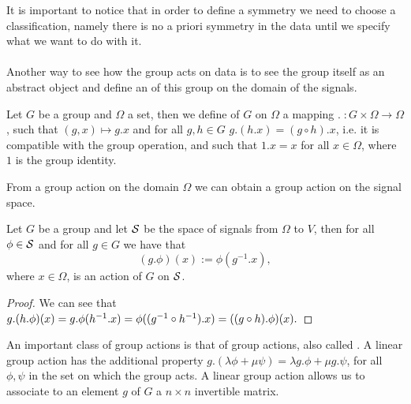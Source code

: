 \documentclass[../3.tex]{subfiles}
\begin{document}
    It is important to notice that in order to define a symmetry we need to choose a classification, namely there is no a priori symmetry in the data until
    we specify what we want to do with it.\\


    \hfill \\
    Another way to see how the group acts on data is to see the group itself as an abstract object and define an  of this group on the domain
    of the signals.

    \begin{defn}
        Let $G$ be a group and $\Omega$ a set, then we define  of $G$ on $\Omega$ a mapping $. \; : G \times \Omega \to \Omega$, such that
        $(g,x) \mapsto g.x$ and for all $g,h \in G$ $g.(h.x) = (g \circ h).x$, i.e. it is compatible with the group operation, and such that
        $1.x = x$ for all $x \in \Omega$, where $1$ is the group identity.
    \end{defn}

    From a group action on the domain $\Omega$ we can obtain a group action on the signal space.

    \begin{prop}
        Let $G$ be a group and let $\mathcal{S}$ be the space of signals from $\Omega$ to $V$, then for all $\phi \in \mathcal{S}$ and for all $g \in G$ we have that
        \[ (g.\phi)(x) := \phi(g^{-1}.x), \]
        where $x \in \Omega$, is an action of $G$ on $\mathcal{S}$.
    \end{prop}
    \begin{proof}
        We can see that $g.(h.\phi)(x) = g.\phi(h^{-1}.x) = \phi((g^{-1} \circ h^{-1}).x) = ((g \circ h).\phi)(x). \qedhere$
    \end{proof}

    An important class of group actions is that of  group actions, also called .
    A linear group action has the additional property $g.(\lambda \phi + \mu \psi) = \lambda g.\phi + \mu g.\psi$, for all $\phi,\psi$ in the set
    on which the group acts. A linear group action allows us to associate to an element $g$ of $G$ a $n \times n$ invertible matrix.
\end{document}
